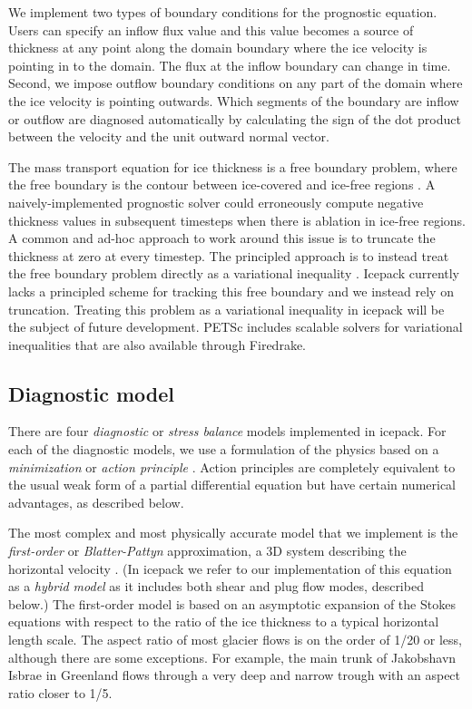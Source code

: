 \documentclass[journal abbreviation, manuscript]{copernicus}
\begin{document}
We implement two types of boundary conditions for the prognostic equation.
Users can specify an inflow flux value and this value becomes a source of thickness at any point along the domain boundary where the ice velocity is pointing in to the domain.
The flux at the inflow boundary can change in time.
Second, we impose outflow boundary conditions on any part of the domain where the ice velocity is pointing outwards.
Which segments of the boundary are inflow or outflow are diagnosed automatically by calculating the sign of the dot product between the velocity and the unit outward normal vector.

The mass transport equation for ice thickness is a free boundary problem, where the free boundary is the contour between ice-covered and ice-free regions \citep{schoof2013ice}.
A naively-implemented prognostic solver could erroneously compute negative thickness values in subsequent timesteps when there is ablation in ice-free regions.
A common and ad-hoc approach to work around this issue is to truncate the thickness at zero at every timestep.
The principled approach is to instead treat the free boundary problem directly as a variational inequality \citep{jouvet2012steady}.
Icepack currently lacks a principled scheme for tracking this free boundary and we instead rely on truncation.
Treating this problem as a variational inequality in icepack will be the subject of future development.
PETSc includes scalable solvers for variational inequalities \citep{bueler2020petsc} that are also available through Firedrake.


\subsection{Diagnostic model}

There are four \emph{diagnostic} or \emph{stress balance} models implemented in icepack.
For each of the diagnostic models, we use a formulation of the physics based on a \emph{minimization} or \emph{action principle} \citep{dukowicz2010consistent}.
Action principles are completely equivalent to the usual weak form of a partial differential equation but have certain numerical advantages, as described below.

The most complex and most physically accurate model that we implement is the \emph{first-order} or \emph{Blatter-Pattyn} approximation, a 3D system describing the horizontal velocity \citep{blatter1995velocity, pattyn2003new}.
(In icepack we refer to our implementation of this equation as a \emph{hybrid model} as it includes both shear and plug flow modes, described below.)
The first-order model is based on an asymptotic expansion of the Stokes equations with respect to the ratio of the ice thickness to a typical horizontal length scale.
The aspect ratio of most glacier flows is on the order of 1/20 or less, although there are some exceptions.
For example, the main trunk of Jakobshavn Isbrae in Greenland flows through a very deep and narrow trough with an aspect ratio closer to 1/5.
\end{document}
